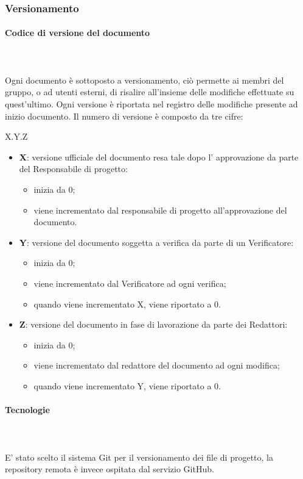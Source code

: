 	\subsubsection{Versionamento}
	\paragraph{Codice di versione del documento} \mbox{}\\ \mbox{}\\
	Ogni documento è sottoposto a versionamento, ciò permette ai membri del gruppo, o ad utenti esterni, di risalire all'insieme delle modifiche effettuate su quest'ultimo. Ogni versione è riportata nel registro delle modifiche presente ad inizio documento.
	Il numero di versione è composto da tre cifre:
	\begin{center}
		X.Y.Z
	\end{center}
	\begin{itemize}
		\item \textbf{X}: versione ufficiale del documento resa tale dopo l' approvazione da parte del Responsabile di progetto:
		\begin{itemize}
			\item inizia da 0;
			\item viene incrementato dal responsabile di progetto all'approvazione del documento.
		\end{itemize}
		\item \textbf{Y}: versione del documento soggetta a verifica da parte di un Verificatore:
		\begin{itemize}
			\item inizia da 0;
			\item viene incrementato dal Verificatore ad ogni verifica;
			\item quando viene incrementato X, viene riportato a 0.
		\end{itemize}
		\item \textbf{Z}: versione del documento in fase di lavorazione da parte dei Redattori:
		\begin{itemize}
			\item inizia da 0;
			\item viene incrementato dal redattore del documento ad ogni modifica;
			\item quando viene incrementato Y, viene riportato a 0.
		\end{itemize}			
	\end{itemize}
	\paragraph{Tecnologie} \mbox{}\\ \mbox{}\\
	E' stato scelto il sistema Git per il versionamento dei file di progetto, la repository remota è invece ospitata dal servizio GitHub. 
